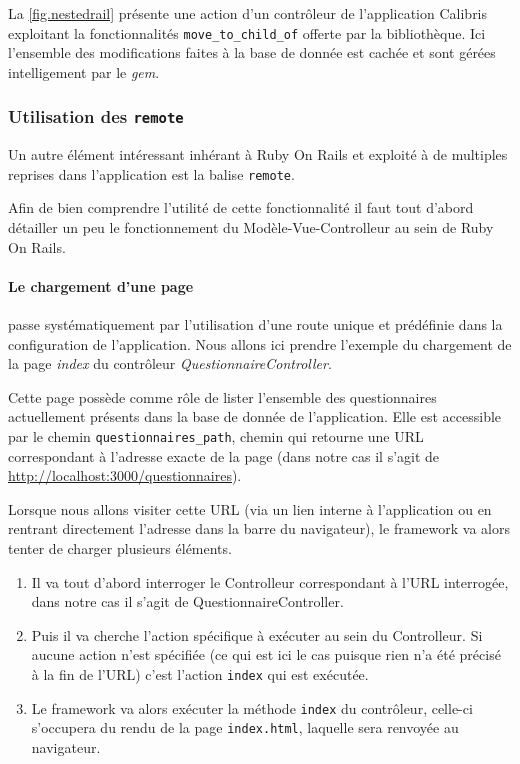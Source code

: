 \documentclass[12pt,a4paper]{book}
\begin{document}
La \cref{fig.nestedrail} présente une action d'un contrôleur de l'application Calibris exploitant la fonctionnalités \texttt{move\_to\_child\_of} offerte par la bibliothèque. Ici l'ensemble des modifications faites à la base de donnée est cachée et sont gérées intelligement par le \textit{gem}.

\subsubsection{Utilisation des \texttt{remote}}

Un autre élément intéressant inhérant à Ruby On Rails et exploité à de multiples reprises dans l'application est la balise \texttt{remote}.

Afin de bien comprendre l'utilité de cette fonctionnalité il faut tout d'abord détailler un peu le fonctionnement du Modèle-Vue-Controlleur au sein de Ruby On Rails.

\paragraph{Le chargement d'une page} passe systématiquement par l'utilisation d'une route unique et prédéfinie dans la configuration de l'application. Nous allons ici prendre l'exemple du chargement de la page \textit{index} du contrôleur \textit{QuestionnaireController}.

Cette page possède comme rôle de lister l'ensemble des questionnaires actuellement présents dans la base de donnée de l'application. Elle est accessible par le chemin \texttt{questionnaires\_path}, chemin qui retourne une URL correspondant à l'adresse exacte de la page (dans notre cas il s'agit de \url{http://localhost:3000/questionnaires}).

Lorsque nous allons visiter cette URL (via un lien interne à l'application ou en rentrant directement l'adresse dans la barre du navigateur), le framework va alors tenter de charger plusieurs éléments.

\begin{enumerate}
  \item Il va tout d'abord interroger le Controlleur correspondant à l'URL interrogée, dans notre cas il s'agit de QuestionnaireController.
  \item Puis il va cherche l'action spécifique à exécuter au sein du Controlleur. Si aucune action n'est spécifiée (ce qui est ici le cas puisque rien n'a été précisé à la fin de l'URL) c'est l'action \texttt{index} qui est exécutée.
  \item Le framework va alors exécuter la méthode \texttt{index} du contrôleur, celle-ci s'occupera du rendu de la page \texttt{index.html}, laquelle sera renvoyée au navigateur.
\end{enumerate}
\end{document}

